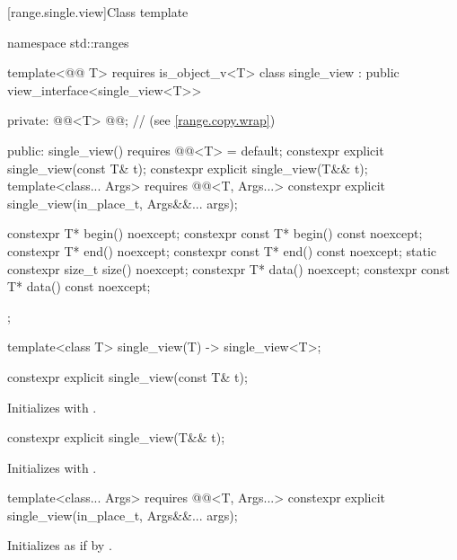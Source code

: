 [range.single.view]{Class template }

%
\begin{codeblock}
namespace std::ranges {
  template<@@ T>
    requires is_object_v<T>
  class single_view : public view_interface<single_view<T>> {
  private:
    @@<T> @@;             // \expos{} (see \ref{range.copy.wrap})

  public:
    single_view() requires @@<T> = default;
    constexpr explicit single_view(const T& t);
    constexpr explicit single_view(T&& t);
    template<class... Args>
      requires @@<T, Args...>
    constexpr explicit single_view(in_place_t, Args&&... args);

    constexpr T* begin() noexcept;
    constexpr const T* begin() const noexcept;
    constexpr T* end() noexcept;
    constexpr const T* end() const noexcept;
    static constexpr size_t size() noexcept;
    constexpr T* data() noexcept;
    constexpr const T* data() const noexcept;
  };

  template<class T>
    single_view(T) -> single_view<T>;
}
\end{codeblock}

%
\begin{itemdecl}
constexpr explicit single_view(const T& t);
\end{itemdecl}

\begin{itemdescr}
\pnum
\effects
Initializes  with .
\end{itemdescr}

%
\begin{itemdecl}
constexpr explicit single_view(T&& t);
\end{itemdecl}

\begin{itemdescr}
\pnum
\effects
Initializes  with .
\end{itemdescr}

%
\begin{itemdecl}
template<class... Args>
  requires @@<T, Args...>
constexpr explicit single_view(in_place_t, Args&&... args);
\end{itemdecl}

\begin{itemdescr}
\pnum
\effects
Initializes  as if by
.
\end{itemdescr}

